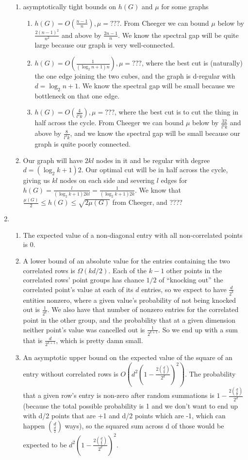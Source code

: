 \documentclass[a4paper]{article}
\begin{document}
\begin{enumerate}
\begin{enumerate}
		\item asymptotically tight bounds on $h(G)$ and $\mu$ for some graphs
			\begin{enumerate}
				\item $h(G) = O(\frac{n-1}{n}), \mu = ???$.  From Cheeger we can bound $\mu$ below by $\frac{2(n-1)^2}{n^2}$ and above by $\frac{2n-1}{n}$.  We know the spectral gap will be quite large because our graph is very well-connected.
				\item $h(G) = O(\frac{1}{(\log_2{n} +1)n}), \mu = ???$, where the best cut is (naturally) the one edge joining the two cubes, and the graph is d-regular with $d = \log_2{n} +1$.  We know the spectral gap will be small because we bottleneck on that one edge.
				\item $h(G) = O(\frac{4}{l^2k}), \mu = ???$, where the best cut is to cut the thing in half across the cycle.  From Cheeger we can bound $\mu$ below by $\frac{32}{l^4k}$ and above by $\frac{8}{l^2k}$, and we know the spectral gap will be small because our graph is quite poorly connected.
			\end{enumerate}
		\item Our graph will have $2kl$ nodes in it and be regular with degree $d = (\log_2{k} +1)2$.  Our optimal cut will be in half across the cycle, giving us $kl$ nodes on each side and severing $l$ edges for $h(G) = \frac{l}{(\log_2{k} +1)2kl} = \frac{1}{(\log_2{k} +1)2k}$.  We know that $\frac{\mu(G)}{2} \leq h(G) \leq \sqrt{2\mu(G)}$ from Cheeger, and ????
	\end{enumerate}
\item
	\begin{enumerate}
		\item The expected value of a non-diagonal entry with all non-correlated points is 0.
		\item A lower bound of an absolute value for the entries containing the two correlated rows is $\Omega(kd/2)$.  Each of the $k-1$ other points in the correlated rows' point groups has chance $1/2$ of ``knocking out'' the correlated point's value at each of its $d$ entries, so we expect to have $\frac{d}{2^k}$ entities nonzero, where a given value's probability of not being knocked out is $\frac{1}{2^k}$.  We also have that number of nonzero entries for the correlated point in the other group, and the probability that at a given dimension neither point's value was cancelled out is $\frac{1}{2^{k+1}}$.  So we end up with a sum that is $\frac{d}{2^{k+1}}$, which is pretty damn small.
		\item An asymptotic upper bound on the expected value of the square of an entry without correlated rows is  $O(d^2(1 - \frac{2\binom{d}{\frac{d}{2}}}{2^d})^2)$.  The probability that a given row's entry is non-zero after random summations is $1 - \frac{2\binom{d}{\frac{d}{2}}}{2^d}$ (because the total possible probability is 1 and we don't want to end up with d/2 points that are +1 and d/2 points which are -1, which can happen $\binom{d}{\frac{d}{2}}$ ways), so the squared sum across d of those would be expected to be $d^2(1 - \frac{2\binom{d}{\frac{d}{2}}}{2^d})^2$.

\end{enumerate}
\end{enumerate}
\end{document}
